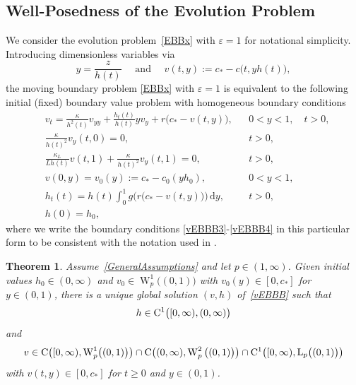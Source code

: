\documentclass[reqno,11pt]{amsart}
\newtheorem{thm}{Theorem}[section]
\numberwithin{equation}{section}
\newcommand{\rd}{\mathrm{d}}
\begin{document}
\subsection{Well-Posedness of the Evolution Problem}


We consider the evolution problem~\eqref{EBBx} with  $\varepsilon=1$
for notational simplicity. Introducing dimensionless variables via
\begin{equation}\label{trafo}
y=\frac{z}{h(t)} \quad\text{ and } \quad v(t,y):=c_*-c\bigl(t,yh(t)\bigr),
\end{equation}
the moving boundary problem \eqref{EBBx} with  $\varepsilon=1$ is
equivalent to the following initial (fixed) boundary value problem
with homogeneous boundary conditions
\begin{subequations}
\label{vEBBB}
\begin{align}
&v_t= \frac{\kappa}{h^2(t)}v_{yy}+\frac{h_t(t)}{h(t)} y v_y + r\bigl(
c_*-v(t,y)\bigr),  &&0<y<1,\quad t>0,\label{vEBBB2}\\ 
&\frac{\kappa}{h(t)^2}v_y(t,0)=0, &&t>0,\label{vEBBB3}\\
&\frac{\kappa_L}{Lh(t)}v(t,1)+\frac{\kappa}{h(t)^2} v_y(t,1)=0, &&t>0,\label{vEBBB4}\\
&v(0,y)=v_0(y):=c_*-c_0(yh_0), && 0<y<1,\label{vEBBB5}\\
&h_t(t)=h(t)\int_0^1 g\big(r\bigl(c_*- v(t,y)\bigr)\big)\,\rd y,&& t>0,\label{vEBBB6}\\
&h(0)=h_0,\label{vEBBB7}
\end{align}
\end{subequations}
where we write the boundary conditions \eqref{vEBBB3}-\eqref{vEBBB4}
in this particular form to be consistent with the notation used in \cite{Amann_Teubner}. 

\begin{thm}\label{T10}
Assume~\eqref{GeneralAssumptions} and let $p\in
(1,\infty)$. Given  initial values $h_0\in (0,\infty)$ and $v_0\in \operatorname{W}_p^1\bigl(
(0,1)\bigr)$ with $v_0(y)\in [0,c_*]$ for $y\in (0,1)$, there is a unique
global solution $(v,h)$ of~\eqref{vEBBB}  such that
$$
h\in {\rm C}^1\big([0,\infty),(0,\infty)\big) 
$$
and
$$
v\in {\rm C}\bigl([0,\infty), \operatorname{W}_p^1\bigl( (0,1)\bigr) \bigr) \cap
{\rm C}\big((0,\infty), \operatorname{W}_p^2\big( (0,1)\bigr)\big)\cap
{\rm C}^1\big([0,\infty), {\rm L}_p\big( (0,1)\bigr)\big) 
$$
with $v(t,y)\in [0,c_*]$ for $t\ge 0$ and $y\in (0,1)$. 
\end{thm}
\end{document}
